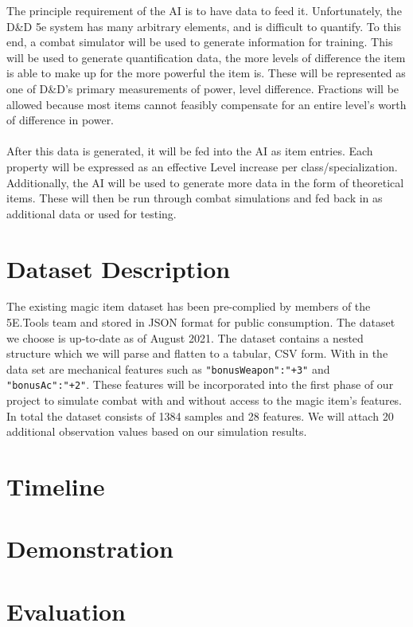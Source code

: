 \documentclass[12pt]{diazessay}
\begin{document}
The principle requirement of the AI is to have data to feed it.
Unfortunately, the D\&D 5e system has many arbitrary elements, and is difficult to quantify.
To this end, a combat simulator will be used to generate information for training.
This will be used to generate quantification data, the more levels of difference the item is able to make up for the more powerful the item is.
These will be represented as one of D\&D's primary measurements of power, level difference.
Fractions will be allowed because most items cannot feasibly compensate for an entire level's worth of difference in power.\\
\\
After this data is generated, it will be fed into the AI as item entries. Each property will be expressed as an effective Level increase per class/specialization.
Additionally, the AI will be used to generate more data in the form of theoretical items.
These will then be run through combat simulations and fed back in as additional data or used for testing.\\


\section*{Dataset Description}

The existing magic item dataset \cite{Mirror5eTools} has been pre-complied by members of the 5E.Tools team and stored in JSON format for public consumption.
The dataset we choose is up-to-date as of August 2021.
The dataset contains a nested structure which we will parse and flatten to a tabular, CSV form.
With in the data set are mechanical features such as \texttt{"bonusWeapon":"+3"} and \texttt{"bonusAc":"+2"}.
These features will be incorporated into the first phase of our project to simulate combat with and without access to the magic item's features.
In total the dataset consists of 1384 samples and 28 features.
We will attach 20 additional observation values based on our simulation results.


\section*{Timeline}


\section*{Demonstration}


\section*{Evaluation}
\end{document}
